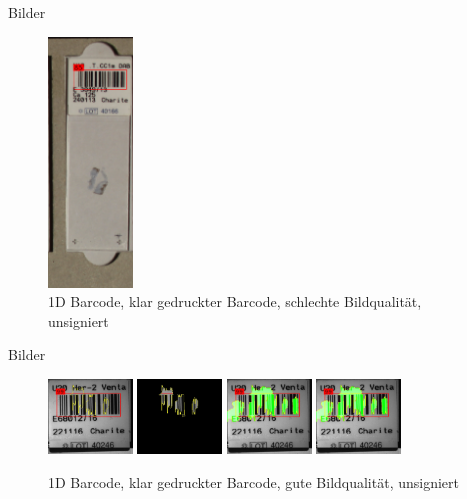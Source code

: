 \documentclass{beamer}
\begin{document}
\begin{frame}{Bilder}
\begin{figure}
      \hfill
      \includegraphics[width=0.2\textwidth]{./assets/Cell111308_1_9_top1_prosconsminweight.PNG}
      \caption{1D Barcode, klar gedruckter Barcode, schlechte Bildqualität, unsigniert}
    \end{figure}
  \end{frame}

  \begin{frame}{Bilder}
    \begin{figure}
      \includegraphics[width=0.2\textwidth]{./assets/E2016068012P1-A-5_GBG-Her2IH_0000000000008E5B-label_top1_positiveonlywithrest.jpg}
      \hfill
      \includegraphics[width=0.2\textwidth]{./assets/E2016068012P1-A-5_GBG-Her2IH_0000000000008E5B-label_top1_positiveonly.jpg}
      \hfill
      \includegraphics[width=0.2\textwidth]{./assets/E2016068012P1-A-5_GBG-Her2IH_0000000000008E5B-label_top1_proscons.jpg}
      \hfill
      \includegraphics[width=0.2\textwidth]{./assets/E2016068012P1-A-5_GBG-Her2IH_0000000000008E5B-label_top1_prosconsminweight.jpg}
      \caption{1D Barcode, klar gedruckter Barcode, gute Bildqualität, unsigniert}
    \end{figure}
  \end{frame}
\end{document}
